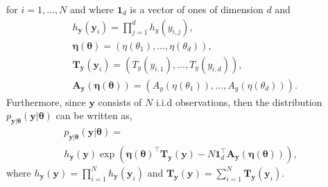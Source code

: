 for $i = 1, \ldots, N$ and where $\mathbf{1}_d$ is a vector of ones of dimension $d$ and
\begin{equation*}
\begin{aligned}
&h_{\boldsymbol{y}}(\boldsymbol{y}_i) = \prod_{j = 1}^d h_{y}\left(y_{i,j}\right), \\ 
&\boldsymbol{\eta}(\boldsymbol{\theta}) = \left(\eta(\theta_1), \dots, \eta(\theta_d)\right), \\
&\mathbf{T}_{\boldsymbol{y}}(\boldsymbol{y}_i) = \left(T_y(y_{i,1}), \ldots, T_y(y_{i,d})\right), \\
&\mathbf{A}_{\boldsymbol{y}}\left(\boldsymbol{\eta}\left(\boldsymbol{\theta}\right)\right) = \left(A_y\left(\eta\left(\theta_1\right)\right), \ldots, A_y\left(\eta\left(\theta_d\right)\right)\right).
\end{aligned}
\end{equation*}
Furthermore, since 
$\mathbf{y}$ consists of $N$ i.i.d observations, then the distribution $p_{\mathbf{y}|\boldsymbol{\theta}}(\mathbf{y}|\boldsymbol{\theta})$ can be written as, 
\begin{multline}
    \label{eq:likelihood_y_phi}
    p_{\mathbf{y}|\boldsymbol{\theta}}(\mathbf{y}|\boldsymbol{\theta}) = \\
    h_{\mathbf{y}}(\mathbf{y}) \exp \left(\boldsymbol{\eta}(\boldsymbol{\theta})^{\top}\mathbf{T}_{\mathbf{y}}(\mathbf{y}) - N  \mathbf{1}_d^\top \mathbf{A}_{\boldsymbol{y}}(\boldsymbol{\eta}(\boldsymbol{\theta})) \right),
\end{multline}
where $h_{\mathbf{y}}(\mathbf{y}) = \prod_{i=1}^N h_{\boldsymbol{y} }(\boldsymbol{y}_i)$  and $\mathbf{T}_{\mathbf{y} }(\mathbf{y}) = \sum_{i = 1}^N \mathbf{T}_{\boldsymbol{y} }(\boldsymbol{y}_i)$.


